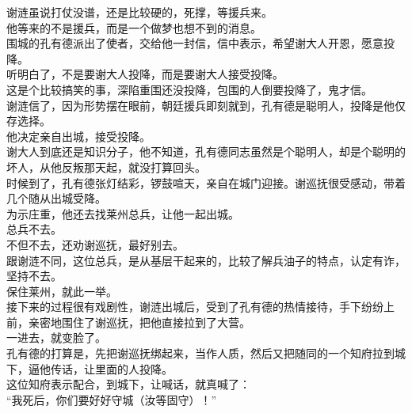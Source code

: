 \begin{multicols}{\theparacolNo}
谢涟虽说打仗没谱，还是比较硬的，死撑，等援兵来。\\

他等来的不是援兵，而是一个做梦也想不到的消息。\\

围城的孔有德派出了使者，交给他一封信，信中表示，希望谢大人开恩，愿意投降。\\

听明白了，不是要谢大人投降，而是要谢大人接受投降。\\

这是个比较搞笑的事，深陷重围还没投降，包围的人倒要投降了，鬼才信。\\

谢涟信了，因为形势摆在眼前，朝廷援兵即刻就到，孔有德是聪明人，投降是他仅存选择。\\

他决定亲自出城，接受投降。\\

谢大人到底还是知识分子，他不知道，孔有德同志虽然是个聪明人，却是个聪明的坏人，从他反叛那天起，就没打算回头。\\

时候到了，孔有德张灯结彩，锣鼓喧天，亲自在城门迎接。谢巡抚很受感动，带着几个随从出城受降。\\

为示庄重，他还去找莱州总兵，让他一起出城。\\

总兵不去。\\

不但不去，还劝谢巡抚，最好别去。\\

跟谢涟不同，这位总兵，是从基层干起来的，比较了解兵油子的特点，认定有诈，坚持不去。\\

保住莱州，就此一举。\\

接下来的过程很有戏剧性，谢涟出城后，受到了孔有德的热情接待，手下纷纷上前，亲密地围住了谢巡抚，把他直接拉到了大营。\\

一进去，就变脸了。\\

孔有德的打算是，先把谢巡抚绑起来，当作人质，然后又把随同的一个知府拉到城下，逼他传话，让里面的人投降。\\

这位知府表示配合，到城下，让喊话，就真喊了：\\

“我死后，你们要好好守城（汝等固守）！”\\


\end{multicols}
